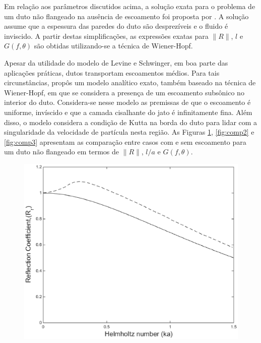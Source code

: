 Em relação aos parâmetros discutidos acima, a solução exata para o problema de um duto não flangeado na ausência de escoamento foi proposta por . A solução assume que a espessura das paredes do duto são desprezíveis e o fluido é inviscido. A partir destas simplificações, as expressões exatas para $\|R\|$, $l$ e $G(f,\theta)$ são obtidas utilizando-se a técnica de Wiener-Hopf. 

Apesar da utilidade do modelo de Levine e Schwinger, em boa parte das aplicações práticas, dutos transportam escoamentos médios. Para tais circunstâncias,  propôs um modelo analítico exato, também baseado na técnica de Wiener-Hopf, em que se considera a presença de um escoamento subsônico no interior do duto. Considera-se nesse modelo as premissas de que o escoamento é uniforme, invíscido e que a camada cisalhante do jato é infinitamente fina. Além disso, o modelo considera a condição de Kutta na borda do duto para lidar com a singularidade da velocidade de partícula nesta região. As Figuras \ref{fig:comp1}, \ref{fig:comp2} e \ref{fig:comp3} apresentam as comparação entre casos com e sem escoamento para um duto não flangeado em termos de $\|R\|$, $l/a$ e $G(f,\theta)$.

\begin{figure}[ht!]
\centering
  \includegraphics[width=.9\linewidth]{figuras/abs_r_comparacao.eps}
  \label{fig:comp1}
\end{figure}

